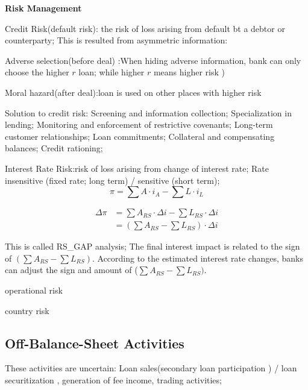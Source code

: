 \documentclass[10pt, a4paper]{article}
\begin{document}
            \medskip

        \textbf{Risk Management} 


            \quad Credit Risk(default risk): the risk of loss arising from default bt a debtor or counterparty; This is resulted from asymmetric information: 
            
            \quad \quad Adverse selection(before deal) :When hiding adverse information, bank can only choose the higher $r$ loan; while higher $r$ means higher risk ) 
            
            \quad \quad Moral hazard(after deal):loan is used on other places with higher risk  

            \quad \quad Solution to credit risk: Screening and information collection; Specialization in lending; Monitoring and enforcement of restrictive covenants; Long-term customer relationships; Loan commitments; Collateral and compensating balances; Credit rationing; 

            \medskip

            \quad Interest Rate Risk:risk of loss arising from change of interest rate; Rate insensitive (fixed rate; long term) / sensitive (short term); 
            $$\pi = \sum A\cdot i_A - \sum L\cdot i_L$$
            
            \begin{align*}
            \Delta \pi &= 
            \sum A_{RS} \cdot \Delta i - \sum L_{RS} \cdot \Delta i \\
            &= (\sum A_{RS} - \sum L_{RS}) \cdot \Delta i
        \end{align*}

            \quad  This is called RS\_GAP analysis; The final interest impact is related to the sign of $(\sum A_{RS} - \sum L_{RS})$. According to the estimated interest rate changes, banks can adjust the sign and amount of ($\sum A_{RS} - \sum L_{RS})$.

            \quad operational risk 

            \quad country  risk 


    \subsection{Off-Balance-Sheet Activities}
        These activities are uncertain: Loan sales(secondary loan participation ) / loan securitization , generation of fee income, trading activities; 
    
\end{document}
